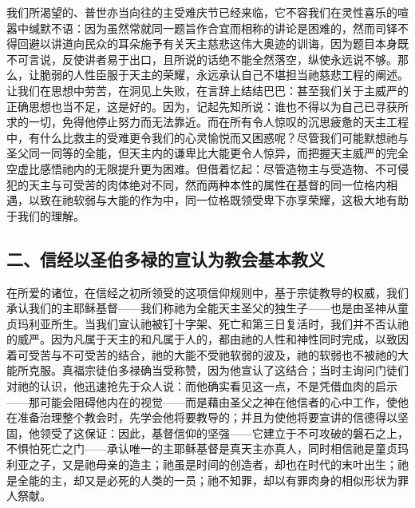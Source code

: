 我们所渴望的、普世亦当向往的主受难庆节已经来临，它不容我们在灵性喜乐的喧嚣中缄默不语：因为虽然常就同一题旨作合宜而相称的讲论是困难的，然而司铎不得回避以讲道向民众的耳朵施予有关天主慈悲这伟大奥迹的训诲，因为题目本身既不可言说，反使讲者易于出口，且所说的话绝不能全然落空，纵使永远说不够。那么，让脆弱的人性臣服于天主的荣耀，永远承认自己不堪担当祂慈悲工程的阐述。让我们在思想中劳苦，在洞见上失败，在言辞上结结巴巴：甚至我们关于主威严的正确思想也当不足，这是好的。因为，记起先知所说：谁也不得以为自己已寻获所求的一切，免得他停止努力而无法靠近。而在所有令人惊叹的沉思疲惫的天主工程中，有什么比救主的受难更令我们的心灵愉悦而又困惑呢？尽管我们可能默想祂与圣父同一同等的全能，但天主内的谦卑比大能更令人惊异，而把握天主威严的完全空虚比感悟祂内的无限提升更为困难。但借着忆起：尽管造物主与受造物、不可侵犯的天主与可受苦的肉体绝对不同，然而两种本性的属性在基督的同一位格内相遇，以致在祂软弱与大能的作为中，同一位格既领受卑下亦享荣耀，这极大地有助于我们的理解。\par


\subsection{二、信经以圣伯多禄的宣认为教会基本教义}

在所爱的诸位，在信经之初所领受的这项信仰规则中，基于宗徒教导的权威，我们承认我们的主耶稣基督——我们称祂为全能天主圣父的独生子——也是由圣神从童贞玛利亚所生。当我们宣认祂被钉十字架、死亡和第三日复活时，我们并不否认祂的威严。因为凡属于天主的和凡属于人的，都由祂的人性和神性同时完成，以致因着可受苦与不可受苦的结合，祂的大能不受祂软弱的波及，祂的软弱也不被祂的大能所克服。真福宗徒伯多禄确当受称赞，因为他宣认了这结合；当时主询问门徒们对祂的认识，他迅速抢先于众人说：而他确实看见这一点，不是凭借血肉的启示——那可能会阻碍他内在的视觉——而是藉由圣父之神在他信者的心中工作，使他在准备治理整个教会时，先学会他将要教导的；并且为使他将要宣讲的信德得以坚固，他领受了这保证：因此，基督信仰的坚强——它建立于不可攻破的磐石之上，不惧怕死亡之门——承认唯一的主耶稣基督是真天主亦真人，同时相信祂是童贞玛利亚之子，又是祂母亲的造主；祂虽是时间的创造者，却也在时代的末叶出生；祂是全能的主，却又是必死的人类的一员；祂不知罪，却以有罪肉身的相似形状为罪人祭献。\par

